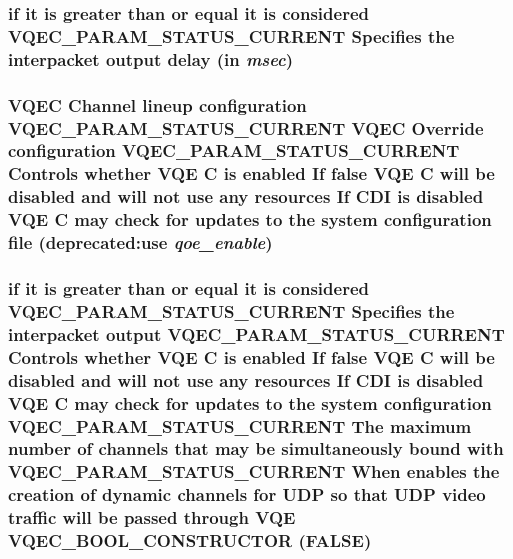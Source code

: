\subsubsection{\setlength{\rightskip}{0pt plus 5cm}if it is greater than or equal it is considered VQEC\_\-PARAM\_\-STATUS\_\-CURRENT Specifies the interpacket output delay (in {\em msec})}\label{vqec__cfg__settings_8h_361d4e6971811d1808c09d8580a85263}


\subsubsection{\setlength{\rightskip}{0pt plus 5cm}VQEC Channel lineup configuration VQEC\_\-PARAM\_\-STATUS\_\-CURRENT VQEC Override configuration VQEC\_\-PARAM\_\-STATUS\_\-CURRENT Controls whether VQE \bf{C} is enabled If false VQE \bf{C} will be disabled and will not use any resources If CDI is disabled VQE \bf{C} may check for updates \bf{to} the system configuration file (deprecated:use {\em qoe\_\-enable})}\label{vqec__cfg__settings_8h_85a51cea08b65ba6fa628a74b9ce7b18}


\subsubsection{\setlength{\rightskip}{0pt plus 5cm}if it is greater than or equal it is considered VQEC\_\-PARAM\_\-STATUS\_\-CURRENT Specifies the interpacket output VQEC\_\-PARAM\_\-STATUS\_\-CURRENT Controls whether VQE \bf{C} is enabled If false VQE \bf{C} will be disabled and will not use any resources If CDI is disabled VQE \bf{C} may check for updates \bf{to} the system configuration VQEC\_\-PARAM\_\-STATUS\_\-CURRENT The maximum number of \bf{channels} that may be simultaneously bound with VQEC\_\-PARAM\_\-STATUS\_\-CURRENT When enables the creation of dynamic \bf{channels} for UDP so that UDP video traffic will be passed through VQE VQEC\_\-BOOL\_\-CONSTRUCTOR (\bf{FALSE})}\label{vqec__cfg__settings_8h_c475b7da024bfdf8ad9792f704859601}


